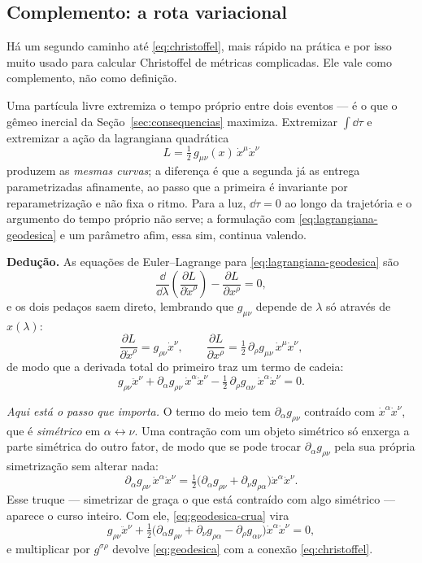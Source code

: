 \documentclass[12pt,a4paper,oneside]{book}
\theoremstyle{rgplain}
\theoremstyle{rgremark}
\begin{document}
\subsection*{Complemento: a rota variacional}

Há um segundo caminho até \eqref{eq:christoffel}, mais rápido na prática e por
isso muito usado para calcular Christoffel de métricas complicadas. Ele vale
como complemento, não como definição.

Uma partícula livre extremiza o tempo próprio entre dois eventos --- é o que o
gêmeo inercial da Seção~\ref{sec:consequencias} maximiza. Extremizar
$\int\dd\tau$ e extremizar a ação da lagrangiana quadrática
\begin{equation}
  L=\tfrac12\,g_{\mu\nu}(x)\,\dot x^\mu\dot x^\nu
  \label{eq:lagrangiana-geodesica}
\end{equation}
produzem as \emph{mesmas curvas}; a diferença é que a segunda já as entrega
parametrizadas afinamente, ao passo que a primeira é invariante por
reparametrização e não fixa o ritmo. Para a luz, $\dd\tau=0$ ao longo da
trajetória e o argumento do tempo próprio não serve; a formulação com
\eqref{eq:lagrangiana-geodesica} e um parâmetro afim, essa sim, continua
valendo.

\begin{resultado}
\textbf{Dedução.} As equações de Euler--Lagrange para
\eqref{eq:lagrangiana-geodesica} são
\[
  \frac{\dd}{\dd\lambda}\!\left(\frac{\partial L}{\partial\dot x^\rho}\right)
  -\frac{\partial L}{\partial x^\rho}=0 ,
\]
e os dois pedaços saem direto, lembrando que $g_{\mu\nu}$ depende de $\lambda$
só através de $x(\lambda)$:
\[
  \frac{\partial L}{\partial\dot x^\rho}=g_{\rho\nu}\dot x^\nu,
  \qquad
  \frac{\partial L}{\partial x^\rho}=\tfrac12\,\partial_\rho g_{\mu\nu}\,
  \dot x^\mu\dot x^\nu ,
\]
de modo que a derivada total do primeiro traz um termo de cadeia:
\begin{equation}
  g_{\rho\nu}\ddot x^\nu
  +\partial_\alpha g_{\rho\nu}\,\dot x^\alpha\dot x^\nu
  -\tfrac12\,\partial_\rho g_{\alpha\nu}\,\dot x^\alpha\dot x^\nu=0 .
  \label{eq:geodesica-crua}
\end{equation}

\emph{Aqui está o passo que importa.} O termo do meio tem $\partial_\alpha
g_{\rho\nu}$ contraído com $\dot x^\alpha\dot x^\nu$, que é \emph{simétrico}
em $\alpha\leftrightarrow\nu$. Uma contração com um objeto simétrico só
enxerga a parte simétrica do outro fator, de modo que se pode trocar
$\partial_\alpha g_{\rho\nu}$ pela sua própria simetrização sem alterar nada:
\[
  \partial_\alpha g_{\rho\nu}\,\dot x^\alpha\dot x^\nu
  =\tfrac12\bigl(\partial_\alpha g_{\rho\nu}+\partial_\nu g_{\rho\alpha}\bigr)
   \dot x^\alpha\dot x^\nu .
\]
Esse truque --- simetrizar de graça o que está contraído com algo simétrico ---
aparece o curso inteiro. Com ele, \eqref{eq:geodesica-crua}
vira
\[
  g_{\rho\nu}\ddot x^\nu
  +\tfrac12\bigl(\partial_\alpha g_{\rho\nu}+\partial_\nu g_{\rho\alpha}
    -\partial_\rho g_{\alpha\nu}\bigr)\dot x^\alpha\dot x^\nu=0 ,
\]
e multiplicar por $g^{\sigma\rho}$ devolve \eqref{eq:geodesica} com a conexão
\eqref{eq:christoffel}.
\end{resultado}
\end{document}
